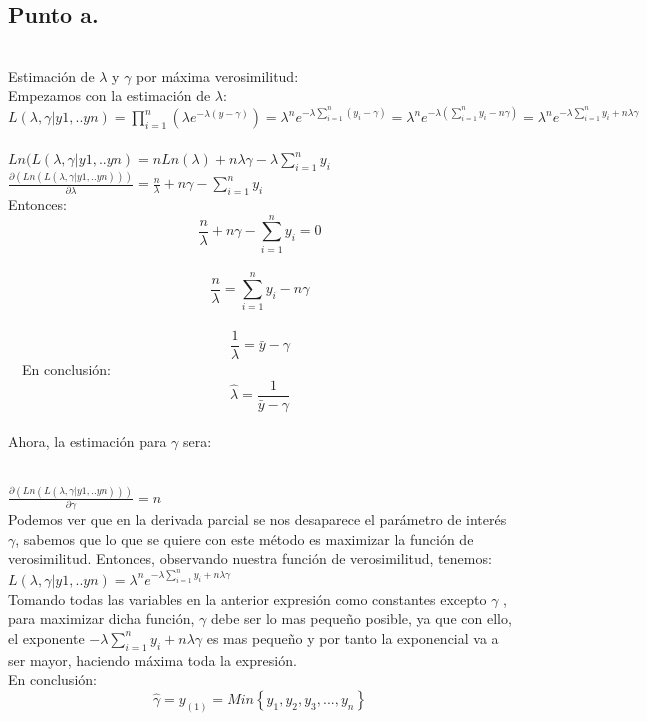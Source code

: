 \documentclass[letterpaper,12pt,onecolumn,titlepage]{article}
\begin{document}
\subsection{Punto a.}
~\\Estimaci\'{o}n de $\lambda$ y $\gamma$ por m\'{a}xima verosimilitud:
~\\ Empezamos con la estimaci\'{o}n de $\lambda$:
~\\ $L(\lambda,\gamma |y1,..yn)=\prod \limits_{i=1}^{n}(\lambda e^{-\lambda (y-\gamma)})=\lambda^n e^{-\lambda \sum \limits_{i=1}^{n}({y_{i}-\gamma})}=\lambda^n e^{-\lambda (\sum \limits_{i=1}^{n}{y_{i}}-n\gamma)}=\lambda^n e^{-\lambda\sum\limits_{i=1}^{n}{y_{i}}+n\lambda\gamma}$
~\\ $Ln(L(\lambda,\gamma |y1,..yn)=nLn(\lambda)+n\lambda\gamma-\lambda\sum\limits_{i=1}^{n}{y_{i}}$
~\\ $\frac{\partial(Ln(L(\lambda,\gamma |y1,..yn)))}{\partial\lambda}=\frac{n}{\lambda}+n\gamma-\sum\limits_{i=1}^{n}{y_{i}}$
~\\Entonces:
$$\frac{n}{\lambda}+n\gamma-\sum\limits_{i=1}^{n}{y_{i}}=0$$
~\ $$\frac{n}{\lambda}=\sum\limits_{i=1}^{n}{y_{i}}-n\gamma$$
~\ $$\frac{1}{\lambda}=\bar{y}-\gamma$$
~\ En conclusi\'{o}n:
$$\hat{\lambda}=\frac{1}{\bar{y}-\gamma}$$
~\\ Ahora, la estimaci\'{o}n para $\gamma$ sera:

~\\ $\frac{\partial(Ln(L(\lambda,\gamma |y1,..yn)))}{\partial\gamma}= n$
~\\ Podemos ver que en la derivada parcial se nos desaparece el par\'{a}metro de inter\'{e}s $\gamma$, sabemos que lo que se quiere con este m\'{e}todo es maximizar la funci\'{o}n de verosimilitud. Entonces, observando nuestra funci\'{o}n de verosimilitud, tenemos:
~\\ $L(\lambda,\gamma |y1,..yn)=\lambda^n e^{-\lambda\sum\limits_{i=1}^{n}{y_{i}}+n\lambda\gamma}$
~\\ Tomando todas las variables en la anterior expresi\'{o}n como constantes excepto $\gamma$ , para maximizar dicha funci\'{o}n, $\gamma$  debe ser lo mas peque\~{n}o posible, ya que con ello, el exponente $-\lambda\sum\limits_{i=1}^{n}{y_{i}}+n\lambda\gamma$ es mas peque\~{n}o y por tanto la exponencial va a ser mayor, haciendo m\'{a}xima toda la expresi\'{o}n.
~\\ En conclusi\'{o}n:
$$\hat{\gamma}=y_(1)= Min\left\lbrace{y_{1},y_{2},y_{3},...,y_{n}}\right\rbrace$$
 
\end{document}
